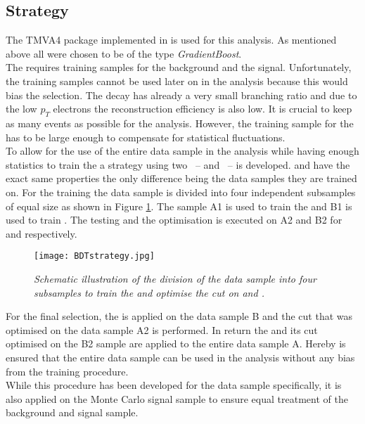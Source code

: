 \subsection{Strategy}
\label{sec:strategy}
The TMVA4 package implemented in \root is used for this analysis. As mentioned above all \bdtn were chosen to be of the type \textit{GradientBoost}.\\
The \bdtn requires training samples for the background and the signal. Unfortunately, the training samples cannot be used later on in the analysis because this would bias the selection. The \BdKstee decay has already a very small branching ratio and due to the low $p_T$ electrons the reconstruction efficiency is also low. It is crucial to keep as many events as possible for the analysis. However, the training sample for the \bdtn has to be large enough to compensate for statistical fluctuations.\\
To allow for the use of the entire data sample in the analysis while having enough statistics to train the \bdtn a strategy using two \bdts \ -- \bdta and \bdtb \ -- is developed. \bdta and \bdtb have the exact same properties the only difference being the data samples they are trained on. For the training the data sample is divided into four independent subsamples of equal size as shown in Figure \ref{fig:samples}. The sample A1 is used to train the \bdta and B1 is used to train \bdtb . The testing and the optimisation is executed on A2 and B2 for \bdta and \bdtb respectively. \\
\begin{figure}[ht]
\begin{center}
\vspace*{-0.5cm}
\texttt{[image: BDTstrategy.jpg]}
\end{center}
\caption{\textit{Schematic illustration of the division of the data sample into four subsamples to train the \bdts and optimise the cut on \bdta and \bdtb.}}
\label{fig:samples}
\end{figure}

For the final selection, the \bdta is applied on the data sample B and the cut that was optimised on the data sample A2 is performed. In return the \bdtb and its cut optimised on the B2 sample are applied to the entire data sample A. Hereby is ensured that the entire data sample can be used in the analysis without any bias from the training procedure.\\
While this procedure has been developed for the \lhcb data sample specifically, it is also applied on the Monte Carlo signal sample to ensure equal treatment of the background and signal sample.\newpage

